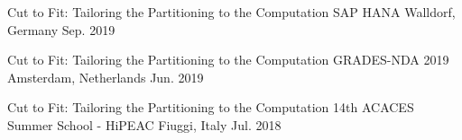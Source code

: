 \begin{cvhonors}
  \cvhonor
    {Cut to Fit: Tailoring the Partitioning to the Computation} %
    {SAP HANA} %
    {Walldorf, Germany} %
    {Sep. 2019} %

  \cvhonor
    {Cut to Fit: Tailoring the Partitioning to the Computation} %
    {GRADES-NDA 2019} %
    {Amsterdam, Netherlands} %
    {Jun. 2019} %

  \cvhonor
    {Cut to Fit: Tailoring the Partitioning to the Computation} %
    {14th ACACES Summer School - HiPEAC} %
    {Fiuggi, Italy} %
    {Jul. 2018} %

\end{cvhonors}
